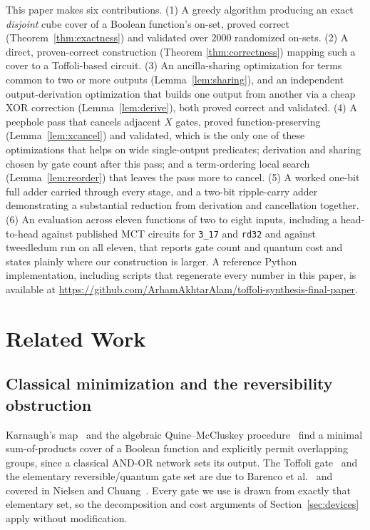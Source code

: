 \documentclass[conference]{IEEEtran}
\theoremstyle{plain}
\begin{document}
This paper makes six contributions. (1) A greedy algorithm producing an
exact \emph{disjoint} cube cover of a Boolean function's on-set, proved
correct (Theorem~\ref{thm:exactness}) and validated over $2000$ randomized
on-sets. (2) A direct, proven-correct construction (Theorem
\ref{thm:correctness}) mapping such a cover to a Toffoli-based circuit.
(3) An ancilla-sharing optimization for terms common to two or more
outputs (Lemma~\ref{lem:sharing}), and an independent output-derivation
optimization that builds one output from another via a cheap XOR
correction (Lemma~\ref{lem:derive}), both proved correct and validated.
(4) A peephole pass that cancels adjacent $X$ gates, proved
function-preserving (Lemma~\ref{lem:xcancel}) and validated, which is the
only one of these optimizations that helps on wide single-output
predicates; derivation and sharing chosen by gate count after this pass;
and a term-ordering local search (Lemma~\ref{lem:reorder}) that leaves
the pass more to cancel. (5) A
worked one-bit full adder carried through every stage, and a two-bit
ripple-carry adder demonstrating a substantial reduction from derivation
and cancellation together. (6) An evaluation across eleven functions of
two to eight inputs, including a head-to-head against published MCT
circuits for \texttt{3\_17} and \texttt{rd32} and against tweedledum run on
all eleven, that reports gate count and quantum cost and states plainly
where our construction is larger. A
reference Python implementation, including scripts that regenerate every
number in this paper, is available at
\url{https://github.com/ArhamAkhtarAlam/toffoli-synthesis-final-paper}.

\section{Related Work}
\label{sec:related}

\subsection{Classical minimization and the reversibility obstruction}
Karnaugh's map~\cite{karnaugh1953} and the algebraic Quine--McCluskey
procedure~\cite{quine1952,mccluskey1956} find a minimal sum-of-products
cover of a Boolean function and explicitly permit overlapping groups,
since a classical AND-OR network sets its output. The Toffoli
gate~\cite{toffoli1980} and the elementary reversible/quantum gate set are
due to Barenco et al.~\cite{barenco1995} and covered in Nielsen and
Chuang~\cite{nielsen2000}. Every gate we use is drawn from exactly that
elementary set, so the decomposition and cost arguments of
Section~\ref{sec:devices} apply without modification.
\end{document}
